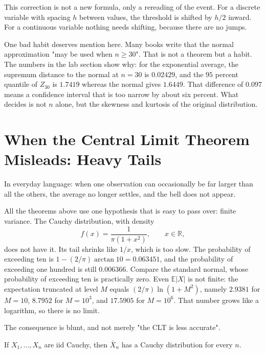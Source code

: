 This correction is not a new formula, only a rereading of the event. For a discrete
variable with spacing $h$ between values, the threshold is shifted by $h/2$ inward.
For a continuous variable nothing needs shifting, because there are no jumps.

One bad habit deserves mention here. Many books write that the normal approximation
"may be used when $n\ge30$". That is not a theorem but a habit. The numbers in the
lab section show why: for the exponential average, the supremum distance to the
normal at $n=30$ is $0.02429$, and the $95$ percent quantile of $Z_{30}$ is
$1.7419$ whereas the normal gives $1.6449$. That difference of $0.097$ means a
confidence interval that is too narrow by about six percent. What decides is not $n$
alone, but the skewness and kurtosis of the original distribution.

\section{When the Central Limit Theorem Misleads: Heavy Tails}

In everyday language: when one observation can occasionally be far larger than all
the others, the average no longer settles, and the bell does not appear.


All the theorems above use one hypothesis that is easy to pass over: finite variance.
The Cauchy distribution, with density
\[
f(x)=\frac{1}{\pi(1+x^2)},\qquad x\in\mathbb{R},
\]
does not have it. Its tail shrinks like $1/x$, which is too slow. The probability of
exceeding ten is $1-(2/\pi)\arctan 10=0.063451$, and the probability of exceeding
one hundred is still $0.006366$. Compare the standard normal, whose probability of
exceeding ten is practically zero. Even $\mathbb{E}|X|$ is not finite: the
expectation truncated at level $M$ equals $(2/\pi)\ln(1+M^2)$, namely $2.9381$ for
$M=10$, $8.7952$ for $M=10^3$, and $17.5905$ for $M=10^6$. That number grows
like a logarithm, so there is no limit.

The consequence is blunt, and not merely "the CLT is less accurate".

\begin{proposisi}
If $X_1,\dots,X_n$ are iid Cauchy, then $\bar X_n$ has a Cauchy distribution for
every $n$.
\end{proposisi}

